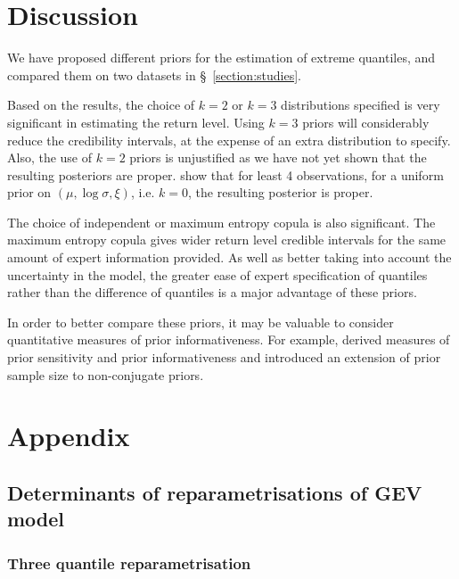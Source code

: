 \documentclass{article}
\begin{document}
\section{Discussion}
%

%
We have proposed different priors for the estimation of extreme quantiles,
and compared them on two datasets in \S~\ref{section:studies}.
%

%
Based on the results,
the choice of $k = 2$ or
$k = 3$ distributions specified is very significant
in estimating the return level.
Using $k = 3$ priors will considerably reduce the credibility intervals,
at the expense of an extra distribution to specify.
Also, the use of $k = 2$ priors is unjustified as we have not yet
shown that the resulting posteriors are proper.
\cite{northrop2016} show that for least 4 observations,
for a uniform prior on $(\mu, \log \sigma, \xi)$,
i.e. $k = 0$, the resulting posterior is proper.
%

%
The choice of independent or maximum entropy copula is also significant.
The maximum entropy copula gives wider return level credible intervals
for the same amount of expert information provided.
As well as better taking into account the uncertainty in the model,
the greater ease of expert specification of
quantiles rather than the difference of quantiles
is a major advantage of these priors.
%

%
In order to better compare these priors,
it may be valuable to consider quantitative measures of
prior informativeness.
For example,
\cite{reimherr2014prior} derived measures
of prior sensitivity and prior informativeness
and \cite{reimherr2014prior} introduced an extension
of prior sample size to non-conjugate priors.
%
\section{Appendix}
%
\subsection{Determinants of reparametrisations of GEV model}
\label{appendix:reparametrisation}
%
\subsubsection*{Three quantile reparametrisation}
%
\end{document}
